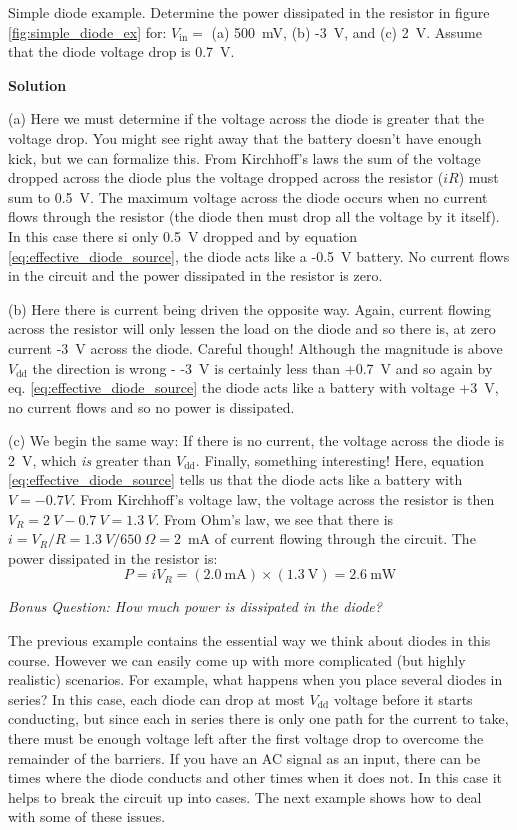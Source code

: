 \documentclass{tufte-book}
\newcommand\Solution{\par\textbf{\textsf{Solution}}\par\medskip}
\begin{document}
\begin{myexample}[label = ex:simple_diode]{Simple diode example.}
Determine the power dissipated in the resistor in figure \ref{fig:simple_diode_ex} for: $V_\text{in} = $ (a) 500~mV, (b) -3~V, and (c) 2~V. Assume that the diode voltage drop is 0.7~V.
\Solution
(a) Here we must determine if the voltage across the diode is greater that the voltage drop. You might see right away that the battery doesn't have enough kick, but we can formalize this. From Kirchhoff's laws the sum of the voltage dropped across the diode plus the voltage dropped across the resistor ($iR$) must sum to 0.5~V. The maximum voltage across the diode occurs when no current flows through the resistor (the diode then must drop all the voltage by it itself). In this case there si only 0.5~V dropped and by equation \ref{eq:effective_diode_source}, the diode acts like a -0.5~V battery. No current flows in the circuit and the power dissipated in the resistor is zero.

(b) Here there is current being driven the opposite way. Again, current flowing across the resistor will only lessen the load on the diode and so there is, at zero current -3~V across the diode. Careful though! Although the magnitude is above $V_\text{dd}$ the direction is wrong - -3~V is certainly less than +0.7~V and so again by eq. \ref{eq:effective_diode_source} the diode acts like a battery with voltage +3~V, no current flows and so no power is dissipated.

(c) We begin the same way: If there is no current, the voltage across the diode is 2~V, which \textit{is} greater than $V_\text{dd}$. Finally, something interesting! Here, equation \ref{eq:effective_diode_source} tells us that the diode acts like a battery with $V=-0.7V$. From Kirchhoff's voltage law, the voltage across the resistor is then $V_R = 2~V-0.7~V = 1.3~V$. From Ohm's law, we see that there is $i = V_R/R = 1.3~V/650~\Omega = 2$~mA of current flowing through the circuit. The power dissipated in the resistor is:
$$
P = iV_R = \left(2.0~\text{mA}\right)\times\left(1.3~\text{V}\right) = 2.6~\text{mW}
$$

\textit{Bonus Question: How much power is dissipated in the diode?}
\end{myexample}

The previous example contains the essential way we think about diodes in this course. However we can easily come up with more complicated (but highly realistic) scenarios. For example, what happens when you place several diodes in series? In this case, each diode can drop at most $V_\text{dd}$ voltage before it starts conducting, but since each in series there is only one path for the current to take, there must be enough voltage left after the first voltage drop to overcome the remainder of the barriers. If you have an AC signal as an input, there can be times where the diode conducts and other times when it does not. In this case it helps to break the circuit up into cases. The next example shows how to deal with some of these issues.
\end{document}
